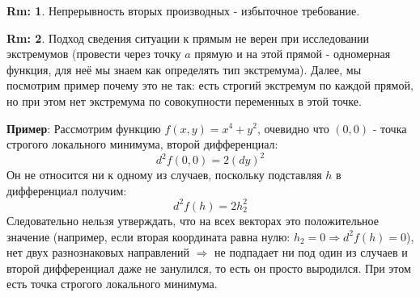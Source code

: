 \documentclass[12pt]{article}
\theoremstyle{definition}
\newtheorem{rem}{Rm:}
\begin{document}
\begin{rem}
	Непрерывность вторых производных - избыточное требование.
\end{rem}
\begin{rem}
	Подход сведения ситуации к прямым не верен при исследовании экстремумов (провести через точку $a$ прямую и на этой прямой - одномерная функция, для неё мы знаем как определять тип экстремума). Далее, мы посмотрим пример почему это не так: есть строгий экстремум по каждой прямой, но при этом нет экстремума по совокупности переменных в этой точке.
\end{rem}
\textbf{Пример}: Рассмотрим функцию $f(x,y) = x^4 + y^2$, очевидно что $(0,0)$ - точка строгого локального минимума, второй дифференциал: 
$$
	d^2f(0,0) = 2(dy)^2
$$
Он не относится ни к одному из случаев, поскольку подставляя $h$ в дифференциал получим: $$
	d^2f(h) = 2h_2^2
$$ 
Следовательно нельзя утверждать, что на всех векторах это положительное значение (например, если вторая координата равна нулю: $h_2 = 0 \Rightarrow d^2f(h) = 0$), нет двух разнознаковых направлений $\Rightarrow$ не подпадает ни под один из случаев и второй дифференциал даже не занулился, то есть он просто выродился. При этом есть точка строгого локального минимума.
\end{document}
